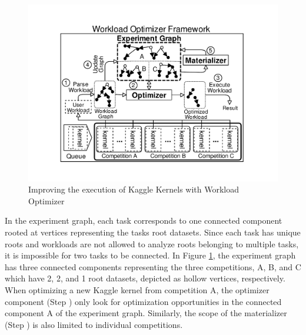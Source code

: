 \begin{figure}
\centering
\includegraphics[width=\columnwidth]{../images/kaggle-workload-optimizer}
\caption{Improving the execution of Kaggle Kernels with Workload Optimizer}
\label{improved-use-case}
\end{figure}

In the experiment graph, each task corresponds to one connected component rooted at vertices representing the tasks root datasets.
Since each task has unique roots and workloads are not allowed to analyze roots belonging to multiple tasks, it is impossible for two tasks to be connected.
In Figure \ref{improved-use-case}, the experiment graph has three connected components representing the three competitions, A, B, and C which have 2, 2, and 1 root datasets, depicted as hollow vertices, respectively.
When optimizing a new Kaggle kernel from competition A, the optimizer component (Step ) only look for optimization opportunities in the connected component A of the experiment graph.
Similarly, the scope of the materializer (Step ) is also limited to individual competitions.